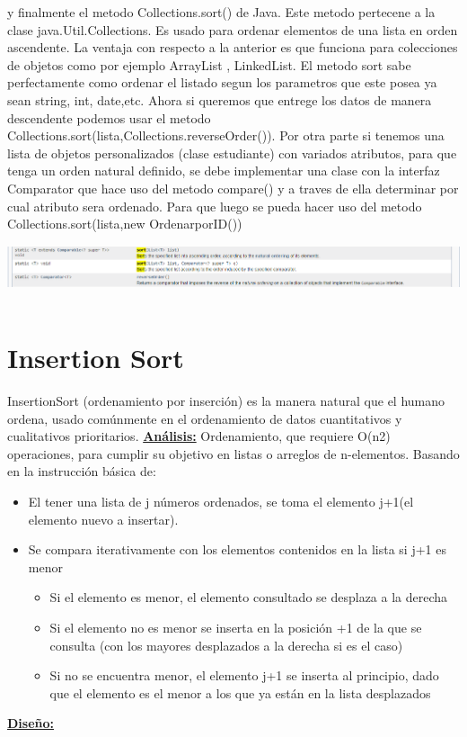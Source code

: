 \documentclass[12pt,letterpaper]{article}
\begin{document}
\vskip 0.4cm
y finalmente el metodo Collections.sort() de Java. Este metodo pertecene a la clase java.Util.Collections. Es usado para ordenar elementos de una lista en orden ascendente. La ventaja con respecto a la anterior es que funciona para colecciones de objetos como por ejemplo ArrayList , LinkedList. El metodo sort sabe perfectamente como ordenar el listado segun los parametros que este posea ya sean string, int, date,etc.
Ahora si queremos que entrege los datos de manera descendente podemos usar el metodo Collections.sort(lista,Collections.reverseOrder()).
\vskip 0.4cm
Por otra parte si tenemos una lista de objetos personalizados (clase estudiante) con variados atributos, para que tenga un orden natural definido, se debe implementar una clase con la interfaz Comparator que hace uso del metodo compare() y a traves de ella determinar por cual atributo sera ordenado. Para que luego se pueda hacer uso del metodo Collections.sort(lista,new OrdenarporID())
\vskip 0.4cm
\includegraphics[width=17cm,height=2cm]{Imagen3} 
\vskip 0.4cm
\newpage
\section{Insertion Sort}
\vskip 0.4cm
InsertionSort (ordenamiento por inserción) es la manera natural que el humano ordena, usado comúnmente en el ordenamiento de datos cuantitativos y cualitativos prioritarios.
\vskip 0.4cm
{\bf\underline {Análisis:}}
\vskip 0.4cm
Ordenamiento, que requiere O(n2) operaciones, para cumplir su objetivo en listas o arreglos de n-elementos. Basando en la instrucción básica de:
\begin{itemize}
\item	El tener una lista de j números ordenados, se toma el elemento j+1(el elemento nuevo a insertar).
\item	Se compara iterativamente con los elementos contenidos en la lista si j+1 es menor
\begin{itemize}
\item Si el elemento es menor, el elemento consultado se desplaza a la derecha
\item Si el elemento no es menor se inserta en la posición +1 de la que se consulta (con los mayores desplazados a la derecha si es el caso)
\item Si no se encuentra menor, el elemento j+1 se inserta al principio, dado que el elemento es el menor a los que ya están en la lista desplazados
\end{itemize}
\end{itemize}
\vskip 0.4cm
{\bf\underline {Diseño:}}
\end{document}
